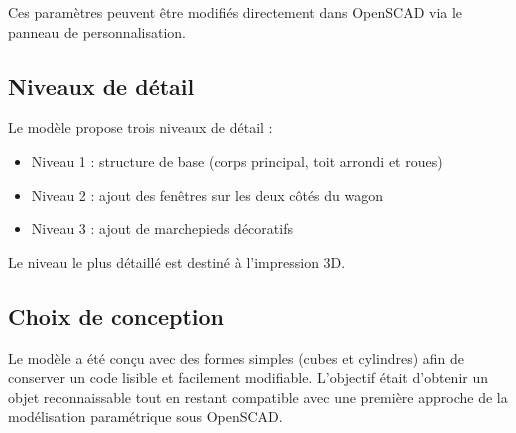 \documentclass[a4paper, 11pt]{article}
\begin{document}
Ces paramètres peuvent être modifiés directement dans OpenSCAD via le panneau de personnalisation.

\subsection{Niveaux de détail}

Le modèle propose trois niveaux de détail :

\begin{itemize}
\item Niveau 1 : structure de base (corps principal, toit arrondi et roues)
\item Niveau 2 : ajout des fenêtres sur les deux côtés du wagon
\item Niveau 3 : ajout de marchepieds décoratifs
\end{itemize}

Le niveau le plus détaillé est destiné à l'impression 3D.

\subsection{Choix de conception}

Le modèle a été conçu avec des formes simples (cubes et cylindres) afin de conserver un code lisible et facilement modifiable. L'objectif était d'obtenir un objet reconnaissable tout en restant compatible avec une première approche de la modélisation paramétrique sous OpenSCAD.
\end{document}
